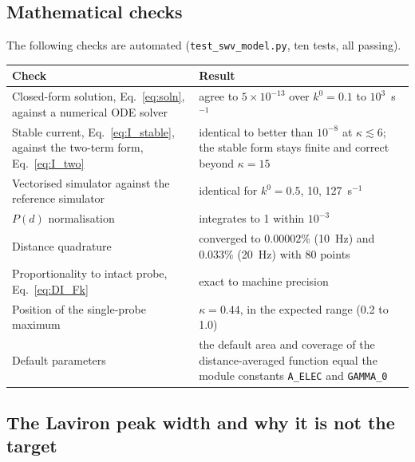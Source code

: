 \documentclass[10pt,a4paper]{article}
\numberwithin{equation}{section}
\newcommand{\kappaMax}{0.44}
\newcommand{\odeMaxErr}{\ensuremath{5\times10^{-13}}}
\newcommand{\quadErrEighty}{0.00002}
\newcommand{\quadErrEightyTwentyHz}{0.033}
\begin{document}
\subsection{Mathematical checks}
\label{sec:valid-math}

The following checks are automated (\texttt{test\_swv\_model.py}, ten tests, all passing).

\begin{center}
\small\renewcommand{\arraystretch}{1.2}
\begin{tabular}{@{}p{4.8cm}p{8.8cm}@{}}
\toprule
Check & Result \\
\midrule
Closed-form solution, Eq.~\eqref{eq:soln}, against a numerical ODE solver & agree to $\odeMaxErr$ over $k^0=0.1$ to $10^3$~s$^{-1}$ \\
Stable current, Eq.~\eqref{eq:I_stable}, against the two-term form, Eq.~\eqref{eq:I_two} & identical to better than $10^{-8}$ at $\kappa\lesssim6$; the stable form stays finite and correct beyond $\kappa=15$ \\
Vectorised simulator against the reference simulator & identical for $k^0=0.5$, 10, 127~s$^{-1}$ \\
$P(d)$ normalisation & integrates to 1 within $10^{-3}$ \\
Distance quadrature & converged to $\quadErrEighty$\% (10~Hz) and $\quadErrEightyTwentyHz$\% (20~Hz) with 80 points \\
Proportionality to intact probe, Eq.~\eqref{eq:DI_Fk} & exact to machine precision \\
Position of the single-probe maximum & $\kappa=\kappaMax$, in the expected range (0.2 to 1.0) \\
Default parameters & the default area and coverage of the distance-averaged function equal the module constants \texttt{A\_ELEC} and \texttt{GAMMA\_0} \\
\bottomrule
\end{tabular}
\end{center}

\subsection{The Laviron peak width and why it is not the target}
\end{document}
